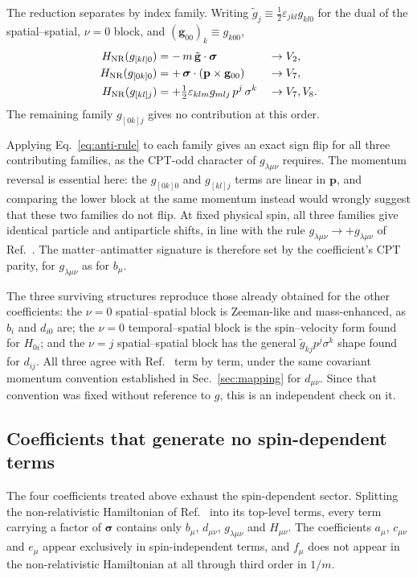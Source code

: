 \documentclass[
  aps,
  prd,
  reprint,
  amsmath,
  amssymb,
  nofootinbib,
  superscriptaddress,
  floatfix
]{revtex4-2}
\newcommand{\sig}{\bm{\sigma}}
\begin{document}
The reduction separates by index family. Writing
$\tilde g_j\equiv\tfrac12\varepsilon_{jkl}g_{kl0}$ for the dual of the
spatial--spatial, $\nu=0$ block, and $(\mathbf{g}_{00})_k\equiv g_{k00}$,
\begin{align}
  H_{\rm NR}(g_{[kl]0}) &= -\,m\,\tilde{\mathbf g}\cdot\sig  &&\to V_2, \\
  H_{\rm NR}(g_{[0k]0}) &= +\,\sig\cdot(\mathbf p\times\mathbf{g}_{00}) &&\to V_7, \\
  H_{\rm NR}(g_{[kl]j}) &= +\tfrac12\varepsilon_{klm}g_{mlj}\,p^j\,\sigma^k &&\to V_7,V_8 .
\end{align}
The remaining family $g_{[0k]j}$ gives no contribution at this order.

Applying Eq.~\eqref{eq:anti-rule} to each family gives an exact sign flip
for all three contributing families, as the CPT-odd character of
$g_{\lambda\mu\nu}$ requires. The momentum reversal is essential here: the
$g_{[0k]0}$ and $g_{[kl]j}$ terms are linear in $\mathbf p$, and comparing
the lower block at the same momentum instead would wrongly suggest that
these two families do not flip. At fixed physical spin, all three families
give identical particle and antiparticle shifts, in line with the rule
$g_{\lambda\mu\nu}\to+g_{\lambda\mu\nu}$ of Ref.~\cite{KosteleckyLane1999b}.
The matter--antimatter signature is therefore set by the coefficient's CPT
parity, for $g_{\lambda\mu\nu}$ as for $b_\mu$.

The three surviving structures reproduce those already obtained for the
other coefficients: the $\nu=0$ spatial--spatial block is Zeeman-like and
mass-enhanced, as $b_i$ and $d_{i0}$ are; the $\nu=0$
temporal--spatial block is the spin--velocity form found for $H_{0i}$; and
the $\nu=j$ spatial--spatial block has the general
$\tilde g_{kj}p^j\sigma^k$ shape found for $d_{ij}$. All three agree with
Ref.~\cite{KosteleckyLane1999} term by term, under the same covariant
momentum convention established in Sec.~\ref{sec:mapping} for
$d_{\mu\nu}$. Since that convention was fixed without reference to $g$,
this is an independent check on it.

\subsection{Coefficients that generate no spin-dependent terms}
\label{sec:nospin}

The four coefficients treated above exhaust the spin-dependent sector.
Splitting the non-relativistic Hamiltonian of Ref.~\cite{KosteleckyLane1999}
into its top-level terms, every term carrying a factor of $\sig$ contains
only $b_\mu$, $d_{\mu\nu}$, $g_{\lambda\mu\nu}$ and $H_{\mu\nu}$. The
coefficients $a_\mu$, $c_{\mu\nu}$ and $e_\mu$ appear exclusively in
spin-independent terms, and $f_\mu$ does not appear in the non-relativistic
Hamiltonian at all through third order in $1/m$.
\end{document}
